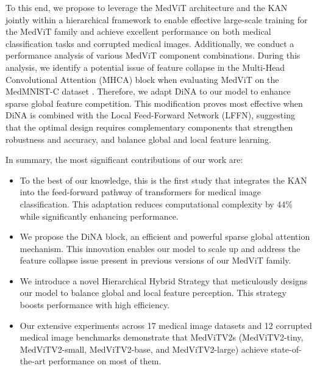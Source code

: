 \documentclass[times,twocolumn,final]{elsarticle}
\begin{document}
To this end, we propose to leverage the MedViT architecture and the KAN jointly within a hierarchical framework to enable effective large-scale training for the MedViT family and achieve excellent performance on both medical classification tasks and corrupted medical images. Additionally, we conduct a performance analysis of various MedViT component combinations. During this analysis, we identify a potential issue of feature collapse in the Multi-Head Convolutional Attention (MHCA) block when evaluating MedViT on the MedMNIST-C dataset \cite{di2024medmnist}. Therefore, we adapt DiNA to our model to enhance sparse global feature competition. This modification proves most effective when DiNA is combined with the Local Feed-Forward Network (LFFN), suggesting that the optimal design requires complementary components that strengthen robustness and accuracy, and balance global and local feature learning.

In summary, the most significant contributions of our work are:
\begin{itemize}
    \item To the best of our knowledge, this is the first study that integrates the KAN into the feed-forward pathway of transformers for medical image classification. This adaptation reduces computational complexity by 44\% while significantly enhancing performance.
    \item We propose the DiNA block, an efficient and powerful sparse global attention mechanism. This innovation enables our model to scale up and address the feature collapse issue present in previous versions of our MedViT family.
    \item We introduce a novel Hierarchical Hybrid Strategy that meticulously designs our model to balance global and local feature perception. This strategy boosts performance with high efficiency.
    \item Our extensive experiments across 17 medical image datasets and 12 corrupted medical image benchmarks demonstrate that MedViTV2s (MedViTV2-tiny, MedViTV2-small, MedViTV2-base, and MedViTV2-large) achieve state-of-the-art performance on most of them.
\end{itemize}


\end{document}

